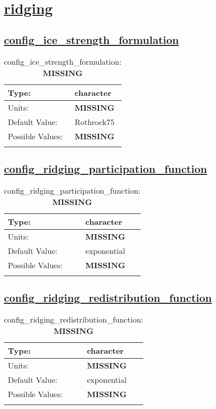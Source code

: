 \section[ridging]{\hyperref[sec:nm_tab_ridging]{ridging}}
\label{sec:nm_sec_ridging}
\subsection[config\_ice\_strength\_formulation]{\hyperref[sec:nm_tab_ridging]{config\_ice\_strength\_formulation}}
\label{subsec:nm_sec_config_ice_strength_formulation}
\begin{center}
\begin{longtable}{| p{2.0in} || p{4.0in} |}
    \hline
    Type: & character \\
    \hline
    Units: & {\bf \color{red} MISSING} \\
    \hline
    Default Value: & Rothrock75 \\
    \hline
    Possible Values: & {\bf \color{red} MISSING} \\
    \hline
    \caption{config\_ice\_strength\_formulation: {\bf \color{red} MISSING}}
\end{longtable}
\end{center}
\subsection[config\_ridging\_participation\_function]{\hyperref[sec:nm_tab_ridging]{config\_ridging\_participation\_function}}
\label{subsec:nm_sec_config_ridging_participation_function}
\begin{center}
\begin{longtable}{| p{2.0in} || p{4.0in} |}
    \hline
    Type: & character \\
    \hline
    Units: & {\bf \color{red} MISSING} \\
    \hline
    Default Value: & exponential \\
    \hline
    Possible Values: & {\bf \color{red} MISSING} \\
    \hline
    \caption{config\_ridging\_participation\_function: {\bf \color{red} MISSING}}
\end{longtable}
\end{center}
\subsection[config\_ridging\_redistribution\_function]{\hyperref[sec:nm_tab_ridging]{config\_ridging\_redistribution\_function}}
\label{subsec:nm_sec_config_ridging_redistribution_function}
\begin{center}
\begin{longtable}{| p{2.0in} || p{4.0in} |}
    \hline
    Type: & character \\
    \hline
    Units: & {\bf \color{red} MISSING} \\
    \hline
    Default Value: & exponential \\
    \hline
    Possible Values: & {\bf \color{red} MISSING} \\
    \hline
    \caption{config\_ridging\_redistribution\_function: {\bf \color{red} MISSING}}
\end{longtable}
\end{center}
